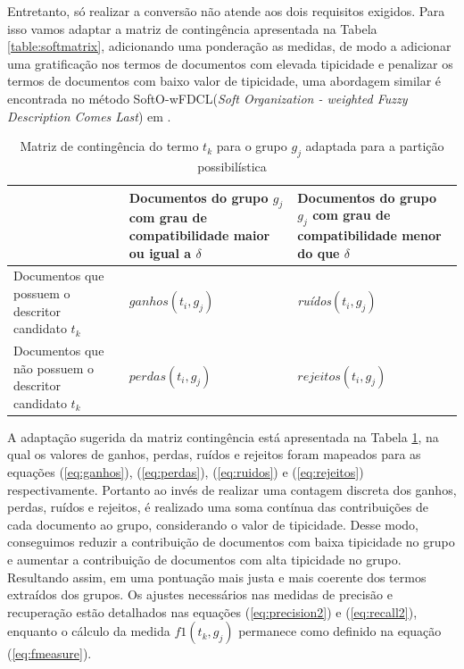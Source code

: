 Entretanto, só realizar a conversão não atende aos dois requisitos exigidos. Para isso
vamos adaptar a matriz de contingência apresentada na Tabela \ref{table:softmatrix}, adicionando uma
ponderação as medidas, de modo a adicionar uma gratificação nos termos de documentos com elevada
tipicidade e penalizar os termos de documentos com baixo valor de tipicidade, uma abordagem similar
é encontrada no método SoftO-wFDCL({\it Soft Organization - weighted Fuzzy Description Comes Last})
em .

\begin{table}[!htp]
  \centering
  \begin{tabular}{ |p{5cm}|p{5cm}|p{5cm}|}
    \cline{2-3}
    \multicolumn{1}{p{5cm}|}{} & Documentos do grupo $g_j$ com grau de compatibilidade 
    maior ou igual a $\delta$ &
    Documentos do grupo $g_j$ com grau de compatibilidade menor do que $\delta$ \\
    \hline
    Documentos que possuem o descritor candidato $t_k$ & \parbox[c]{5cm}{\centering
  $ganhos(t_i,g_j)$} & \parbox[c]{5cm}{\centering \it ruídos\/$(t_i,g_j)$} \\
    \hline
    Documentos que não possuem o descritor candidato $t_k$ & \parbox[c]{5cm}{\centering
  $perdas(t_i,g_j)$} & \parbox[c]{5cm}{\centering $rejeitos(t_i,g_j)$} \\
    \hline
  \end{tabular}
  \caption{Matriz de contingência do termo $t_k$ para o grupo $g_j$ adaptada para a partição
  possibilística}
  \label{table:softmatrix2}
\end{table}

A adaptação sugerida da matriz contingência está apresentada na Tabela \ref{table:softmatrix2}, na
qual os valores de ganhos, perdas, ruídos e rejeitos foram mapeados para as equações
(\ref{eq:ganhos}), (\ref{eq:perdas}),  (\ref{eq:ruidos}) e  (\ref{eq:rejeitos}) respectivamente.
Portanto ao invés de realizar uma contagem discreta dos ganhos, perdas, ruídos e rejeitos, é
realizado uma soma contínua das contribuições de cada documento ao grupo, considerando o valor de
tipicidade. Desse modo, conseguimos reduzir a contribuição de documentos com baixa tipicidade no
grupo e aumentar a contribuição de documentos com alta tipicidade no grupo. Resultando assim, em uma
pontuação mais justa e mais coerente dos termos extraídos dos grupos. Os ajustes necessários nas
medidas de precisão e recuperação estão detalhados nas equações (\ref{eq:precision2}) e
(\ref{eq:recall2}), enquanto o cálculo da medida $f1(t_k,g_j)$ permanece como definido na
equação (\ref{eq:fmeasure}).

